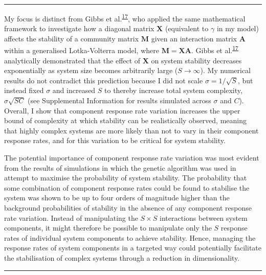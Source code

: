 \documentclass[]{article}
\begin{document}
\begin{center}\rule{0.5\linewidth}{\linethickness}\end{center}

My focus is distinct from Gibbs et
al.\textsuperscript{\protect\hyperlink{ref-Gibbs2017}{17}}, who applied
the same mathematical framework to investigate how a diagonal matrix
\(\mathbf{X}\) (equivalent to \(\gamma\) in my model) affects the
stability of a community matrix \(\mathbf{M}\) given an interaction
matrix \(\mathbf{A}\) within a generalised Lotka-Volterra model, where
\(\mathbf{M} = \mathbf{XA}\). Gibbs et
al.\textsuperscript{\protect\hyperlink{ref-Gibbs2017}{17}} analytically
demonstrated that the effect of \(\mathbf{X}\) on system stability
decreases exponentially as system size becomes arbitrarily large
(\(S \to \infty\)). My numerical results do not contradict this
prediction because I did not scale \(\sigma = 1 / \sqrt{S}\), but
instead fixed \(\sigma\) and increased \(S\) to thereby increase total
system complexity, \(\sigma\sqrt{SC}\) (see Supplemental Information for
results simulated across \(\sigma\) and \(C\)). Overall, I show that
component response rate variation increases the upper bound of
complexity at which stability can be realistically observed, meaning
that highly complex systems are more likely than not to vary in their
component response rates, and for this variation to be critical for
system stability.

The potential importance of component response rate variation was most
evident from the results of simulations in which the genetic algorithm
was used in attempt to maximise the probability of system stability. The
probability that some combination of component response rates could be
found to stabilise the system was shown to be up to four orders of
magnitude higher than the background probabilities of stability in the
absence of any component response rate variation. Instead of
manipulating the \(S \times S\) interactions between system components,
it might therefore be possible to manipulate only the \(S\) response
rates of individual system components to achieve stability. Hence,
managing the response rates of system components in a targeted way could
potentially facilitate the stabilisation of complex systems through a
reduction in dimensionality.

\begin{center}\rule{0.5\linewidth}{\linethickness}\end{center}
\end{document}
